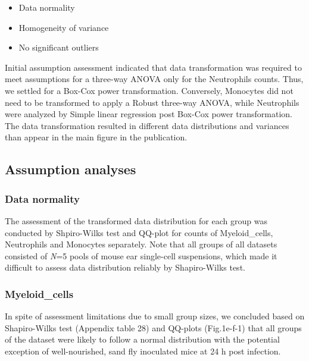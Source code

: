 \documentclass[
  12pt,
  letterpaper,
]{article}
\providecommand{\tightlist}{%
  \setlength{\itemsep}{0pt}\setlength{\parskip}{0pt}}
\begin{document}
\begin{itemize}
\tightlist
\item
  Data normality
\item
  Homogeneity of variance
\item
  No significant outliers
\end{itemize}

Initial assumption assessment indicated that data transformation was required to meet assumptions for a three-way ANOVA only for the Neutrophils counts. Thus, we settled for a Box-Cox power transformation. Conversely, Monocytes did not need to be transformed to apply a Robust three-way ANOVA, while Neutrophils were analyzed by Simple linear regression post Box-Cox power transformation. The data transformation resulted in different data distributions and variances than appear in the main figure in the publication.

\subsection{Assumption analyses}\label{assumption-analyses-1}

\subsubsection{Data normality}\label{data-normality-1}

The assessment of the transformed data distribution for each group was conducted by Shpiro-Wilks test and QQ-plot for counts of Myeloid\_cells, Neutrophils and Monocytes separately. Note that all groups of all datasets consisted of \emph{N}=5 pools of mouse ear single-cell suspensions, which made it difficult to assess data distribution reliably by Shapiro-Wilks test.

\subsubsection{Myeloid\_cells}\label{myeloid_cells-2}

In spite of assessment limitations due to small group sizes, we concluded based on Shapiro-Wilks test (Appendix table 28) and QQ-plots (Fig.1e-f-1) that all groups of the dataset were likely to follow a normal distribution with the potential exception of well-nourished, sand fly inoculated mice at 24 h post infection.
\end{document}
